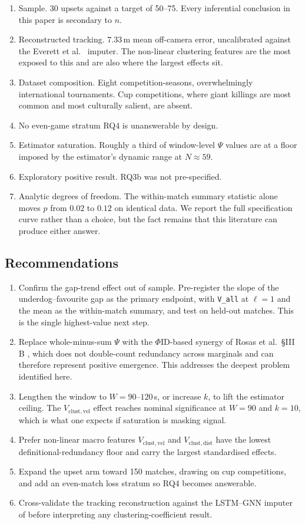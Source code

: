 \documentclass[11pt,a4paper]{article}
\newcommand{\code}[1]{\texttt{\small #1}}
\newcommand{\Vcd}{V_{\mathrm{clust,dist}}}
\newcommand{\Vcv}{V_{\mathrm{clust,vel}}}
\begin{document}
\begin{enumerate}
\item Sample. 30 upsets against a target of 50--75. Every inferential conclusion
in this paper is secondary to $n$.
\item Reconstructed tracking. $7.33$\,m mean off-camera error, uncalibrated against
the Everett et al.\ \cite{everett2023} imputer. The non-linear clustering features are the
most exposed to this and are also where the largest effects sit.
\item Dataset composition. Eight competition-seasons, overwhelmingly international
tournaments. Cup competitions, where giant killings are most common and most culturally
salient, are absent.
\item No even-game stratum RQ4 is unanswerable by design.
\item Estimator saturation. Roughly a third of window-level $\Psi$ values are at
a floor imposed by the estimator's dynamic range at $N\approx59$.
\item Exploratory positive result. RQ3b was not pre-specified.
\item Analytic degrees of freedom. The within-match summary statistic alone moves
$p$ from $0.02$ to $0.12$ on identical data. We report the full specification curve rather
than a choice, but the fact remains that this literature can produce either answer.
\end{enumerate}

\subsection{Recommendations}

\begin{enumerate}
\item Confirm the gap-trend effect out of sample. Pre-register the slope of the
underdog--favourite gap as the primary endpoint, with \code{V\_all} at $\ell=1$ and the mean
as the within-match summary, and test on held-out matches. This is the single highest-value
next step.
\item Replace whole-minus-sum $\Psi$ with the $\Phi$ID-based synergy of Rosas et
al.\ \S III\,B \cite{rosas2020,mediano2021}, which does not double-count redundancy across
marginals and can therefore represent positive emergence. This addresses the deepest
problem identified here.
\item Lengthen the window to $W=90$--$120$\,s, or increase $k$, to lift the
estimator ceiling. The $\Vcv$ effect reaches nominal significance at $W=90$ and $k=10$,
which is what one expects if saturation is masking signal.
\item Prefer non-linear macro features $\Vcv$ and $\Vcd$ have the lowest
definitional-redundancy floor and carry the largest standardised effects.
\item Expand the upset arm toward 150 matches, drawing on cup competitions, and
add an even-match loss stratum so RQ4 becomes answerable.
\item Cross-validate the tracking reconstruction against the LSTM--GNN imputer
of \cite{everett2023} before interpreting any clustering-coefficient result.
\end{enumerate}
\end{document}
